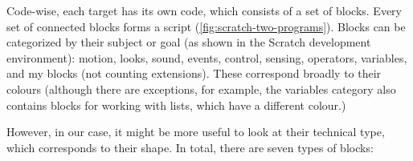 \documentclass[../main]{subfiles}
\begin{document}
Code-wise, each target has its own code, which consists of a set of blocks.
Every set of connected blocks forms a script (\vref{fig:scratch-two-programs}).
Blocks can be categorized by their subject or goal (as shown in the Scratch development environment): \textcolor{scrmove}{motion}, \textcolor{scrlook}{looks}, \textcolor{scrsound}{sound}, \textcolor{screvent}{events}, \textcolor{scrcontrol}{control}, \textcolor{scrsensing}{sensing}, \textcolor{scroperator}{operators}, \textcolor{scrvariable}{variables}, and \textcolor{scrmoreblocks}{my blocks} (not counting extensions).
These correspond broadly to their colours (although there are exceptions, for example, the \textcolor{scrvariable}{variables} category also contains blocks for working with lists, which have a different colour.)

However, in our case, it might be more useful to look at their technical type, which corresponds to their shape.
In total, there are seven types of blocks:
\end{document}
